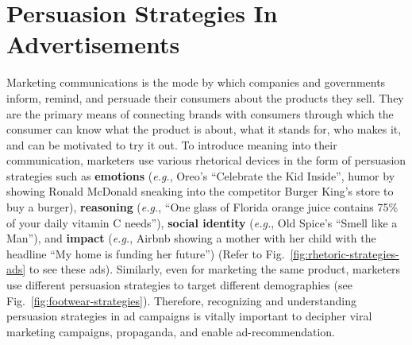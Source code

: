 \section{Persuasion Strategies In Advertisements}
\label{sec:chapter-2 Persuasion Strategies In Advertisements}


Marketing communications is the mode by which companies and governments inform, remind, and persuade their consumers about the products they sell. They are the primary means of connecting brands with consumers through which the consumer can know what the product is about, what it stands for, who makes it, and can be motivated to try it out. To introduce meaning into their communication, marketers use various rhetorical devices in the form of persuasion strategies such as \textbf{emotions} ({\it e.g.}, Oreo's ``Celebrate the Kid Inside'', humor by showing Ronald McDonald sneaking into the competitor Burger King's store to buy a burger), \textbf{reasoning} ({\it e.g.}, ``One glass of Florida orange juice contains 75\% of your daily vitamin C needs''), \textbf{social identity} ({\it e.g.}, Old Spice's ``Smell like a Man''), and \textbf{impact} ({\it e.g.}, Airbnb showing a mother with her child with the headline ``My home is funding her future'') (Refer to Fig.~\ref{fig:rhetoric-strategies-ads} to see these ads). Similarly, even for marketing the same product, marketers use different persuasion strategies to target different demographies (see Fig.~\ref{fig:footwear-strategies}). Therefore, recognizing and understanding persuasion strategies in ad campaigns is vitally important to decipher viral marketing campaigns, propaganda, and enable ad-recommendation. 




